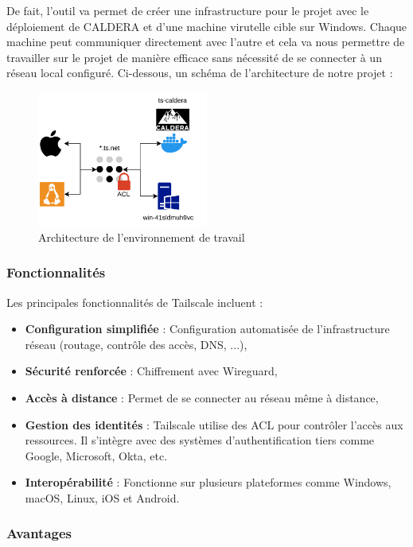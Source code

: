 \documentclass[12pt,letterpaper]{article}
\begin{document}
\bigskip

De fait, l'outil va permet de créer une infrastructure pour le projet avec le déploiement de CALDERA et d'une machine virutelle cible sur Windows. Chaque machine peut communiquer directement avec l'autre et cela va nous permettre de travailler sur le projet de manière efficace sans nécessité de se connecter à un réseau local configuré.
Ci-dessous, un schéma de l'architecture de notre projet :
\begin{figure}[!h]
    \centering
    \includegraphics[width=0.5\textwidth]{images/infra_scheme.png}
    \caption{Architecture de l'environnement de travail}
    \label{fig:architecture}
\end{figure}
\subsubsection{Fonctionnalités}

Les principales fonctionnalités de Tailscale incluent :
\begin{itemize}
    \item \textbf{Configuration simplifiée} : Configuration automatisée de l'infrastructure réseau (routage, contrôle des accès, DNS, ...),
    \item \textbf{Sécurité renforcée} : Chiffrement avec Wireguard,
    \item \textbf{Accès à distance} : Permet de se connecter au réseau même à distance,
    \item \textbf{Gestion des identités} : Tailscale utilise des ACL pour contrôler l'accès aux ressources. Il s'intègre avec des systèmes d'authentification tiers comme Google, Microsoft, Okta, etc.
    \item \textbf{Interopérabilité} : Fonctionne sur plusieurs plateformes comme Windows, macOS, Linux, iOS et Android.
\end{itemize}

\subsubsection{Avantages}
\end{document}
